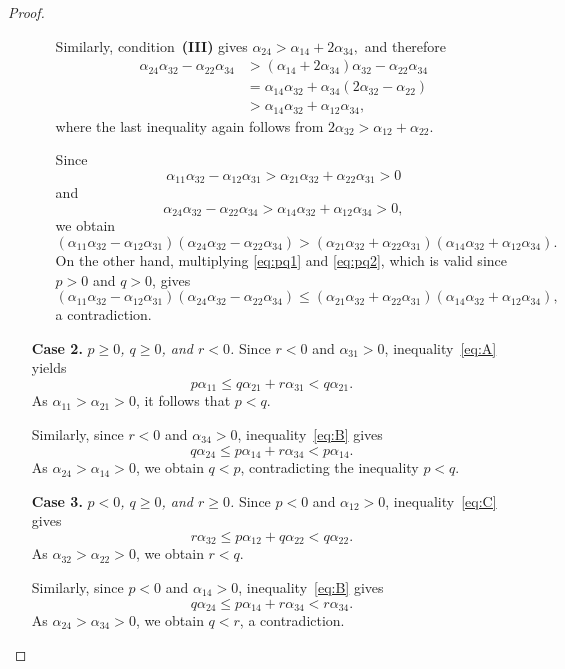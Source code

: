 \documentclass[12pt,a4paper]{amsart}
\theoremstyle{definition}
\begin{document}
\begin{proof}
\begin{enumerate}
\begin{enumerate}
Similarly, condition~\textup{\textbf{(III)}} gives
$
\alpha_{24}>\alpha_{14}+2\alpha_{34},$
and therefore
\begin{align*}
\alpha_{24}\alpha_{32}-\alpha_{22}\alpha_{34}
&>
(\alpha_{14}+2\alpha_{34})\alpha_{32}
-\alpha_{22}\alpha_{34} \\
&=
\alpha_{14}\alpha_{32}
+\alpha_{34}(2\alpha_{32}-\alpha_{22}) \\
&>
\alpha_{14}\alpha_{32}
+\alpha_{12}\alpha_{34},
\end{align*}
where the last inequality again follows from
$
2\alpha_{32}
>
\alpha_{12}+\alpha_{22}.$

Since
\[
\alpha_{11}\alpha_{32}-\alpha_{12}\alpha_{31}
>
\alpha_{21}\alpha_{32}+\alpha_{22}\alpha_{31}>0
\]
and
\[
\alpha_{24}\alpha_{32}-\alpha_{22}\alpha_{34}
>
\alpha_{14}\alpha_{32}+\alpha_{12}\alpha_{34}>0,
\]
we obtain
\[
(\alpha_{11}\alpha_{32}-\alpha_{12}\alpha_{31})
(\alpha_{24}\alpha_{32}-\alpha_{22}\alpha_{34})
>
(\alpha_{21}\alpha_{32}+\alpha_{22}\alpha_{31})
(\alpha_{14}\alpha_{32}+\alpha_{12}\alpha_{34}).
\]
On the other hand, multiplying
\eqref{eq:pq1} and \eqref{eq:pq2}, which is valid since
$p>0$ and $q>0$, gives
\[
(\alpha_{11}\alpha_{32}-\alpha_{12}\alpha_{31})
(\alpha_{24}\alpha_{32}-\alpha_{22}\alpha_{34})
\le
(\alpha_{21}\alpha_{32}+\alpha_{22}\alpha_{31})
(\alpha_{14}\alpha_{32}+\alpha_{12}\alpha_{34}),
\]
a contradiction.

\end{enumerate}

\item[\textbf{Case 2.}] \textit{$p\ge0$, $q\ge0$, and $r<0$.} Since $r<0$ and $\alpha_{31}>0$, inequality~\eqref{eq:A} yields
\[
p\alpha_{11}
\le
q\alpha_{21}+r\alpha_{31}
<
q\alpha_{21}.
\]
As $\alpha_{11}>\alpha_{21}>0$, it follows that $p<q$.

Similarly, since $r<0$ and $\alpha_{34}>0$, inequality~\eqref{eq:B}
gives
\[
q\alpha_{24}
\le
p\alpha_{14}+r\alpha_{34}
<
p\alpha_{14}.
\]
As $\alpha_{24}>\alpha_{14}>0$, we obtain $q<p$, contradicting the inequality $p<q$.

\item[\textbf{Case 3.}] \textit{$p<0$, $q\geq0$, and $r\geq0$.} Since $p<0$ and $\alpha_{12}>0$, inequality~\eqref{eq:C} gives
\[
r\alpha_{32}
\le
p\alpha_{12}+q\alpha_{22}
<
q\alpha_{22}.
\]
As $\alpha_{32}>\alpha_{22}>0$, we obtain $r<q$.

Similarly, since $p<0$ and $\alpha_{14}>0$, inequality~\eqref{eq:B}
gives
\[
q\alpha_{24}
\le
p\alpha_{14}+r\alpha_{34}
<
r\alpha_{34}.
\]
As $\alpha_{24}>\alpha_{34}>0$, we obtain $q<r$, a contradiction.


\end{enumerate}
\end{proof}
\end{document}
